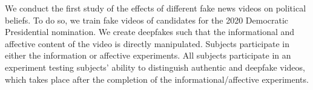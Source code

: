 We conduct the first study of the effects of different fake news
videos on political beliefs. To do so, we train fake videos of
candidates for the 2020 Democratic Presidential nomination. We create
deepfakes such that the informational and affective content of the
video is directly manipulated. Subjects participate in either the
information or affective experiments. All subjects participate in an
experiment testing subjects' ability to distinguish authentic and
deepfake videos, which takes place after the completion of the
informational/affective experiments.
